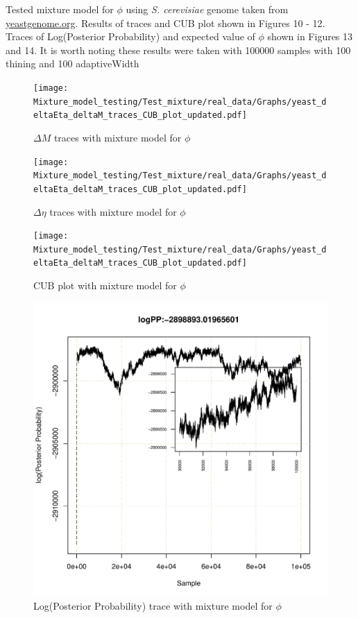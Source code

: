 \documentclass[11pt]{labbook}
\begin{document}
Tested mixture model for $\phi$ using \textit{S. cerevisiae} genome taken from \underline{yeastgenome.org}. Results of traces and CUB plot shown in Figures 10 - 12. Traces of Log(Posterior Probability) and expected value of $\phi$ shown in Figures 13 and 14. It is worth noting these results were taken with 100000 samples with 100 thining and 100 adaptiveWidth

\begin{figure}[H]
\centering
\texttt{[image: Mixture\_model\_testing/Test\_mixture/real\_data/Graphs/yeast\_deltaEta\_deltaM\_traces\_CUB\_plot\_updated.pdf]}
\caption{$\Delta\mathit{M}$ traces with mixture model for $\phi$}
\end{figure}

\begin{figure}[H]
\centering
\texttt{[image: Mixture\_model\_testing/Test\_mixture/real\_data/Graphs/yeast\_deltaEta\_deltaM\_traces\_CUB\_plot\_updated.pdf]}
\caption{$\Delta\eta$ traces with mixture model for $\phi$}
\end{figure}

\begin{figure}[H]
\centering
\texttt{[image: Mixture\_model\_testing/Test\_mixture/real\_data/Graphs/yeast\_deltaEta\_deltaM\_traces\_CUB\_plot\_updated.pdf]}
\caption{CUB plot with mixture model for $\phi$}
\end{figure}

\begin{figure}[H]
\centering
\includegraphics[page=1,scale=0.6]{Mixture_model_testing/Test_mixture/real_data/Graphs/yeast_logPost_mixProb_phi_traces_updated.pdf}
\caption{Log(Posterior Probability) trace with mixture model for $\phi$}
\end{figure}
\end{document}
